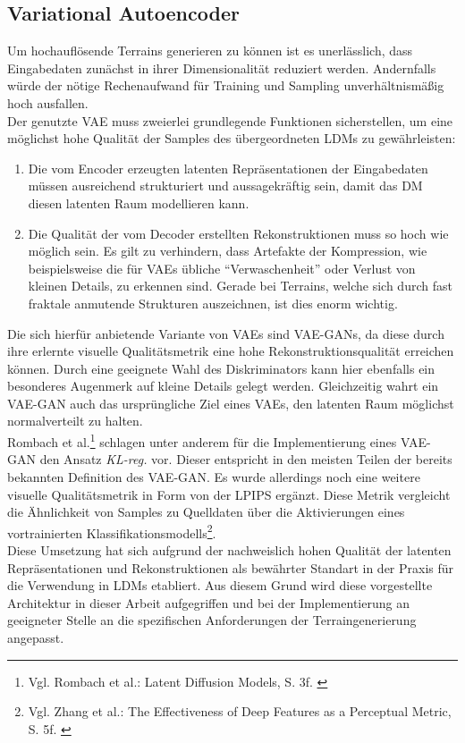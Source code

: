 \subsection {Variational Autoencoder}

Um hochauflösende Terrains generieren zu können ist es unerlässlich, dass Eingabedaten zunächst in ihrer Dimensionalität reduziert werden. Andernfalls würde der nötige Rechenaufwand für Training und Sampling unverhältnismäßig hoch ausfallen. \\
Der genutzte \ac{VAE} muss zweierlei grundlegende Funktionen sicherstellen, um eine möglichst hohe Qualität der Samples des übergeordneten \ac{LDM}s zu gewährleisten:
\begin{enumerate}
    \item Die vom Encoder erzeugten latenten Repräsentationen der Eingabedaten müssen ausreichend strukturiert und aussagekräftig sein, damit das \ac{DM} diesen latenten Raum modellieren kann.  
    \item Die Qualität der vom Decoder erstellten Rekonstruktionen muss so hoch wie möglich sein. Es gilt zu verhindern, dass Artefakte der Kompression, wie beispielsweise die für \ac{VAE}s übliche \enquote{Verwaschenheit} oder Verlust von kleinen Details, zu erkennen sind. Gerade bei Terrains, welche sich durch fast fraktale anmutende Strukturen auszeichnen, ist dies enorm wichtig.
\end{enumerate}
Die sich hierfür anbietende Variante von \ac{VAE}s sind VAE-GANs, da diese durch ihre erlernte visuelle Qualitätsmetrik eine hohe Rekonstruktionsqualität erreichen können. Durch eine geeignete Wahl des Diskriminators kann hier ebenfalls ein besonderes Augenmerk auf kleine Details gelegt werden. Gleichzeitig wahrt ein VAE-GAN auch das ursprüngliche Ziel eines \ac{VAE}s, den latenten Raum möglichst normalverteilt zu halten. \\
Rombach et al.\footnote{
    Vgl. Rombach et al.: Latent Diffusion Models, S. 3f. 
    \cite{rombach2022high}
} schlagen unter anderem für die Implementierung eines VAE-GAN den Ansatz \textit{KL-reg.} vor. Dieser entspricht in den meisten Teilen der bereits bekannten Definition des VAE-GAN. Es wurde allerdings noch eine weitere visuelle Qualitätsmetrik in Form von der \ac{LPIPS} ergänzt. Diese Metrik vergleicht die Ähnlichkeit von Samples zu Quelldaten über die Aktivierungen eines vortrainierten Klassifikationsmodells\footnote{
    Vgl. Zhang et al.: The Effectiveness of Deep Features as a Perceptual Metric, S. 5f. 
    \cite{zhang2018unreasonableeffectivenessdeepfeatures}
}. \\
Diese Umsetzung hat sich aufgrund der nachweislich hohen Qualität der latenten Repräsentationen und Rekonstruktionen als bewährter Standart in der Praxis für die Verwendung in \ac{LDM}s etabliert. Aus diesem Grund wird diese vorgestellte Architektur in dieser Arbeit aufgegriffen und bei der Implementierung an geeigneter Stelle an die spezifischen Anforderungen der Terraingenerierung angepasst.

